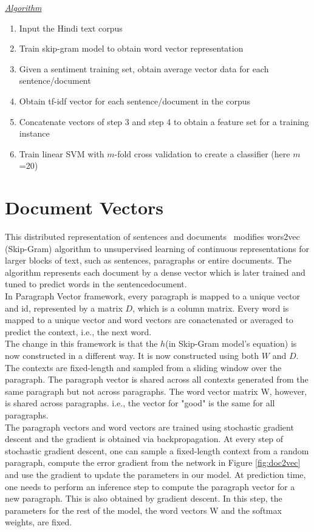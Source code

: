 \underline{\emph{Algorithm}}
\begin{enumerate}
\item Input the Hindi text corpus
\item Train skip-gram model to obtain word vector representation
\item Given a sentiment training set, obtain average vector data for each sentence/document
\item Obtain tf-idf vector for each sentence/document in the corpus
\item Concatenate vectors of step 3 and step 4 to obtain a feature set for a training instance
\item Train linear SVM with $m$-fold cross validation to create a classifier
(here $m$=20)
\end{enumerate}

\section{Document Vectors}
This distributed representation of sentences and documents~\cite{Le:14} modifies wors2vec (Skip-Gram) algorithm to unsupervised learning of continuous representations for larger blocks of text, such as sentences, paragraphs or entire documents. The algorithm represents each document by a dense vector which is later trained and tuned to predict words in the sentence\/document.\\
In Paragraph Vector framework, every paragraph is mapped to a unique vector and id, represented by a matrix $D$, which is a column matrix. Every word is mapped to a unique vector and word vectors are conactenated or averaged to predict the context, i.e., the next word.\\
The change in this framework is that the $h$(in Skip-Gram model's equation) is now constructed in a different way. It is now constructed using both $W$ and $D$.\\
The contexts are fixed-length and sampled from a sliding window over the paragraph. The paragraph vector is shared across all contexts generated from the same paragraph but not across paragraphs.  The word vector matrix W, however, is shared across paragraphs. i.e., the vector for "good" is the same for all paragraphs.\\

The paragraph vectors and word vectors are trained using stochastic gradient descent and the gradient is obtained via backpropagation.  At every step of stochastic gradient descent, one can sample a fixed-length context from a random paragraph, compute the error gradient from the network in Figure \ref{fig:doc2vec} and use the gradient to update the parameters in our model. At prediction time, one needs to perform an inference step to compute the paragraph vector for a new paragraph. This is also obtained by gradient descent.  In this step, the parameters for the rest of the model, the word vectors W
and the softmax weights, are fixed.

